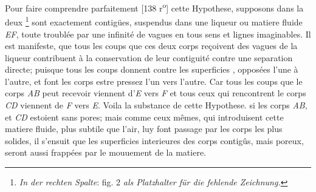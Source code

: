 \pstart Pour faire comprendre parfaitement
[138 r\textsuperscript{o}] cette Hypothese, supposons dans
                     la  deux \footnote{\textit{In der rechten Spalte}: fig. 2 \textit{als Platzhalter für die fehlende Zeichnung.}} sont exactement contig\"{u}es,  suspendus dans une liqueur ou matiere fluide \textit{EF}, toute troubl\'{e}e par une infinit\'{e} de vagues en tous sens et lignes imaginables. Il est manifeste, que tous les coups que ces deux corps re\c{c}oivent des vagues de la liqueur contribuent \`{a} la conservation de leur contiguit\'{e} contre une separation directe; puisque tous les coups donnent contre les superficies , oppos\'{e}es l'une \`{a} l'autre, et font les corps estre pressez l'un vers l'autre. Car tous les coups que le corps \textit{AB} peut recevoir viennent d'\textit{E} vers \textit{F} et tous ceux qui rencontrent le corps \textit{CD} viennent de \textit{F} vers \textit{E}. Voila la substance de cette Hypothese.  si les corps \textit{AB}, et \textit{CD} estoient sans pores; mais comme ceux mêmes, qui introduisent cette matiere fluide, plus subtile que l'air, luy font passage par les corps\protect{} les plus solides, il s'ensuit que les superficies interieures des corps contigûs, mais poreux, seront aussi frapp\'{e}es par le mouuement de la matiere.
